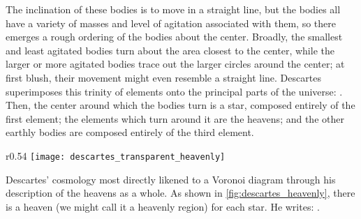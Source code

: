 \documentclass[12pt,twoside]{reedthesis}
\begin{document}
    The inclination of these  bodies is to move in a straight line, but the bodies all have a variety of masses and level of agitation associated with them, so there emerges a rough ordering of the bodies about the center. Broadly, the smallest and least agitated bodies turn about the area closest to the center, while the larger or more agitated bodies trace out the larger circles around the center; at first blush, their movement might even resemble a straight line. Descartes superimposes this trinity of elements onto the principal parts of the universe: \citep[][p. 20]{descartes}. Then, the center around which the bodies turn is a star, composed entirely of the first element; the elements which turn around it are the heavens; and the other earthly bodies are composed entirely of the third element.\par


    \begin{wrapfigure}{r}{0.54\textwidth}
      \centering
      \texttt{[image: descartes\_transparent\_heavenly]}
      \caption{Descartes' Heavenly Regions}
      \label{fig:descartes_heavenly}
    \end{wrapfigure}


   Descartes' cosmology most directly likened to a Voronoi diagram through his description of the heavens as a whole. As shown in \cref{fig:descartes_heavenly}, there is a heaven (we might call it a heavenly region) for each star. He writes: \citep[][p. 35]{descartes}.\par
\end{document}
